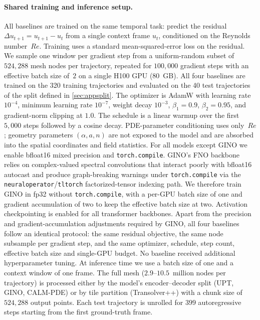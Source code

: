 \documentclass{article}
\begin{document}
\paragraph{Shared training and inference setup.} All baselines are trained on the same temporal task: predict the residual $\Delta u_{t+1}=u_{t+1}-u_t$ from a single context frame $u_t$, conditioned on the Reynolds number~$Re$. Training uses a standard mean-squared-error loss on the residual. We sample one window per gradient step from a uniform-random subset of $524{,}288$ mesh nodes per trajectory, repeated for $100{,}000$ gradient steps with an effective batch size of~$2$ on a single H100 GPU (80~GB). \textcolor{revcolor}{All four baselines are trained on the 320 training trajectories and evaluated on the 40 test trajectories of the split defined in \autoref{sec:appsplit}.} The optimizer is AdamW with learning rate $10^{-4}$, minimum learning rate $10^{-7}$, weight decay $10^{-3}$, $\beta_1=0.9$, $\beta_2=0.95$, and gradient-norm clipping at $1.0$. The schedule is a linear warmup over the first $5{,}000$ steps followed by a cosine decay. PDE-parameter conditioning uses only~$Re$; geometry parameters $(\alpha,a,n)$ are not exposed to the model and are absorbed into the spatial coordinates and field statistics. For all models except GINO we enable bfloat16 mixed precision and \texttt{torch.compile}. GINO's FNO backbone relies on complex-valued spectral convolutions that interact poorly with bfloat16 autocast and produce graph-breaking warnings under \texttt{torch.compile} via the \texttt{neuraloperator}/\texttt{tltorch} factorized-tensor indexing path. We therefore train GINO in fp32 without \texttt{torch.compile}, with a per-GPU batch size of one and gradient accumulation of two to keep the effective batch size at two. Activation checkpointing is enabled for all transformer backbones. \textcolor{revcolor}{Apart from the precision and gradient-accumulation adjustments required by GINO, all four baselines follow an identical protocol: the same residual objective, the same node subsample per gradient step, and the same optimizer, schedule, step count, effective batch size and single-GPU budget. No baseline received additional hyperparameter tuning.} At inference time we use a batch size of one and a context window of one frame. The full mesh (\textcolor{revcolor}{$2.9$--$10.5$}~million nodes per trajectory) is processed either by the model's encoder--decoder split (UPT, GINO, CALM-PDE) or by tile partition (Transolver++) with a chunk size of $524{,}288$ output points. Each test trajectory is unrolled for $399$ autoregressive steps starting from the first ground-truth frame.    
  
\end{document}
